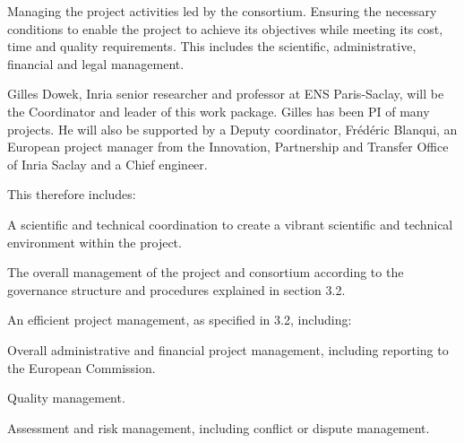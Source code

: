 \begin{workpackage}[id=management,type=MGT,wphases=1-48,
  short=Management,
  title=Management,
  lead=Inr,InrRM=34,InnRM=2,SacRM=2,TumRM=2,LieRM=2,BelRM=2,DelRM=2,FauRM=2]
  
  \begin{wpobjectives}
    Managing the
    project activities led by the consortium. Ensuring the necessary
    conditions to enable
    the project to achieve its objectives while meeting its cost, time
    and quality requirements. This includes the scientific,
    administrative, financial and legal management.

    Gilles Dowek, Inria senior researcher and professor at ENS
    Paris-Saclay, will be the Coordinator and leader of this work
    package. Gilles has been PI of many projects. He will also be
    supported by a Deputy coordinator, Frédéric Blanqui, an European
    project manager from the Innovation, Partnership and Transfer
    Office of Inria Saclay and a Chief engineer.

This therefore includes:
\begin{compactitem}
\item A scientific and technical coordination to create a vibrant scientific and technical environment within the project.
\item The overall management of the project and consortium according to the governance structure and procedures explained in section 3.2.
\item An efficient project management, as specified in 3.2, including:
  \begin{compactitem}
  \item Overall administrative and financial project management, including reporting to the European Commission.
  \item Quality management.
  \item Assessment and risk management, including conflict or dispute management.
  \end{compactitem}
\end{compactitem}
\end{wpobjectives}


\end{workpackage}
